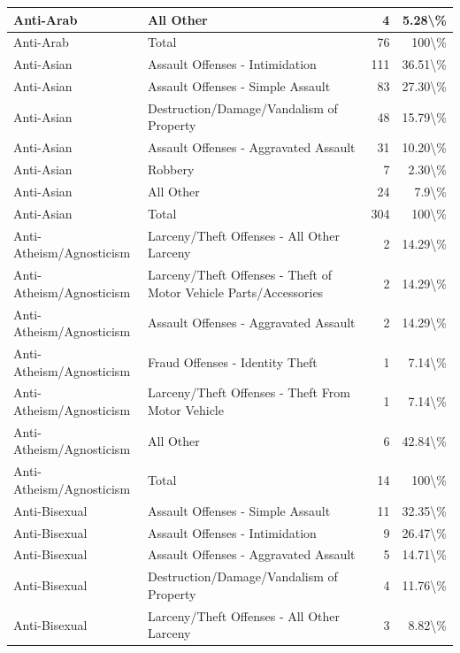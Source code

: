 \documentclass[
]{krantz}
\begin{document}
\begin{longtable}[t]{l|l|r|r}
\hline
Anti-Arab & All Other & 4 & 5.28\textbackslash{}\%\\
\hline
Anti-Arab & Total & 76 & 100\textbackslash{}\%\\
\hline
Anti-Asian & Assault Offenses - Intimidation & 111 & 36.51\textbackslash{}\%\\
\hline
Anti-Asian & Assault Offenses - Simple Assault & 83 & 27.30\textbackslash{}\%\\
\hline
Anti-Asian & Destruction/Damage/Vandalism of Property & 48 & 15.79\textbackslash{}\%\\
\hline
Anti-Asian & Assault Offenses - Aggravated Assault & 31 & 10.20\textbackslash{}\%\\
\hline
Anti-Asian & Robbery & 7 & 2.30\textbackslash{}\%\\
\hline
Anti-Asian & All Other & 24 & 7.9\textbackslash{}\%\\
\hline
Anti-Asian & Total & 304 & 100\textbackslash{}\%\\
\hline
Anti-Atheism/Agnosticism & Larceny/Theft Offenses - All Other Larceny & 2 & 14.29\textbackslash{}\%\\
\hline
Anti-Atheism/Agnosticism & Larceny/Theft Offenses - Theft of Motor Vehicle Parts/Accessories & 2 & 14.29\textbackslash{}\%\\
\hline
Anti-Atheism/Agnosticism & Assault Offenses - Aggravated Assault & 2 & 14.29\textbackslash{}\%\\
\hline
Anti-Atheism/Agnosticism & Fraud Offenses - Identity Theft & 1 & 7.14\textbackslash{}\%\\
\hline
Anti-Atheism/Agnosticism & Larceny/Theft Offenses - Theft From Motor Vehicle & 1 & 7.14\textbackslash{}\%\\
\hline
Anti-Atheism/Agnosticism & All Other & 6 & 42.84\textbackslash{}\%\\
\hline
Anti-Atheism/Agnosticism & Total & 14 & 100\textbackslash{}\%\\
\hline
Anti-Bisexual & Assault Offenses - Simple Assault & 11 & 32.35\textbackslash{}\%\\
\hline
Anti-Bisexual & Assault Offenses - Intimidation & 9 & 26.47\textbackslash{}\%\\
\hline
Anti-Bisexual & Assault Offenses - Aggravated Assault & 5 & 14.71\textbackslash{}\%\\
\hline
Anti-Bisexual & Destruction/Damage/Vandalism of Property & 4 & 11.76\textbackslash{}\%\\
\hline
Anti-Bisexual & Larceny/Theft Offenses - All Other Larceny & 3 & 8.82\textbackslash{}\%\\

\end{longtable}
\end{document}
